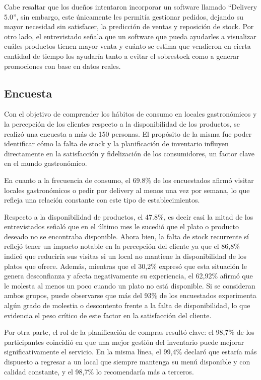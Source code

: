 Cabe resaltar que los dueños intentaron incorporar un software llamado “Delivery 5.0”, sin embargo, este únicamente les permitía gestionar pedidos, dejando su mayor necesidad sin satisfacer, la predicción de ventas y reposición de stock. Por otro lado, el entrevistado señala que un software que pueda ayudarles a visualizar cuáles productos tienen mayor venta y cuánto se estima que vendieron en cierta cantidad de tiempo los ayudaría tanto a evitar el sobrestock como a generar promociones con base en datos reales.

\subsection{Encuesta}\label{sec:encuesta}

Con el objetivo de comprender los hábitos de consumo en locales gastronómicos y la percepción de los clientes respecto a la disponibilidad de los productos, se realizó una encuesta a más de 150 personas. El propósito de la misma fue poder identificar cómo la falta de stock y la planificación de inventario influyen directamente en la satisfacción y fidelización de los consumidores, un factor clave en el mundo gastronómico.

En cuanto a la frecuencia de consumo, el 69.8\% de los encuestados afirmó visitar locales gastronómicos o pedir por delivery al menos una vez por semana, lo que refleja una relación constante con este tipo de establecimientos.

Respecto a la disponibilidad de productos, el 47.8\%, es decir casi la mitad de los entrevistados señaló que en el último mes le sucedió que el plato o producto deseado no se encontraba disponible. Ahora bien, la falta de stock recurrente sí reflejó tener un impacto notable en la percepción del cliente ya que el 86,8\% indicó que reduciría sus visitas si un local no mantiene la disponibilidad de los platos que ofrece. Además, mientras que el 30,2\% expresó que esta situación le genera desconfianza y afecta negativamente su experiencia, el 62,92\% afirmó que le molesta al menos un poco cuando un plato no está disponible. Si se consideran ambos grupos, puede observarse que más del 93\% de los encuestados experimenta algún grado de molestia o descontento frente a la falta de disponibilidad, lo que evidencia el peso crítico de este factor en la satisfacción del cliente.

Por otra parte, el rol de la planificación de compras resultó clave: el 98,7\% de los participantes coincidió en que una mejor gestión del inventario puede mejorar significativamente el servicio. En la misma línea, el 99,4\% declaró que estaría más dispuesto a regresar a un local que siempre mantenga su menú disponible y con calidad constante, y el 98,7\% lo recomendaría más a terceros.


